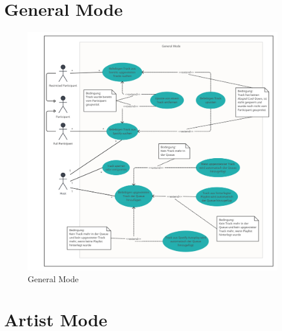 \documentclass[oneside, ngerman]{sdqtechreport}
\begin{document}
\newpage

\section{General Mode}
\label{sec:Anwendungsfälle:General Mode}
\hypertarget{General Mode}{}

\begin{figure}[h]
    \includegraphics[width = 16cm]{LATEX/Pflichtenheft/GraphicDesigns/Use Case General Mode.png}
    \caption{General Mode}
    \label{fig:Use Case General Mode}
\end{figure}

\newpage

\section{Artist Mode}
\label{sec:Anwendungsfälle:Artist Mode}
\hypertarget{Artist Mode}{}
\end{document}
